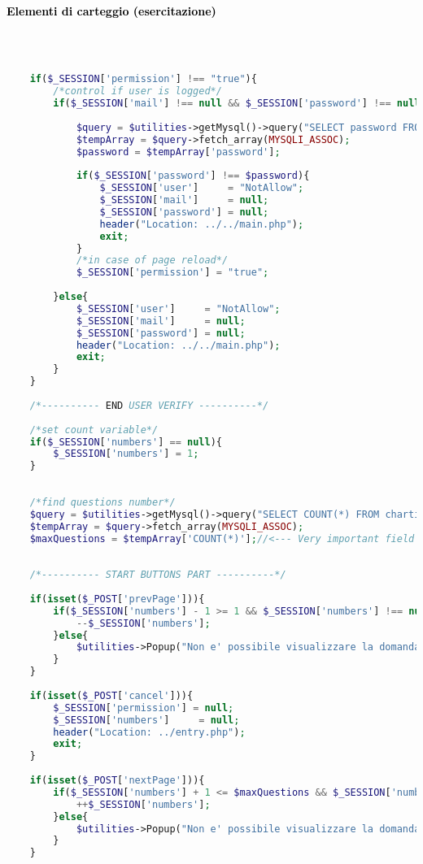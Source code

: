 \paragraph{\textcolor{black}{Elementi di carteggio (esercitazione)}}\leavevmode\\

\begin{lstlisting}[language=php]
	
	if($_SESSION['permission'] !== "true"){
		/*control if user is logged*/
		if($_SESSION['mail'] !== null && $_SESSION['password'] !== null){
			
			$query = $utilities->getMysql()->query("SELECT password FROM user_table1 WHERE (email = '{$_SESSION['mail']}')");
			$tempArray = $query->fetch_array(MYSQLI_ASSOC);
			$password = $tempArray['password'];
			
			if($_SESSION['password'] !== $password){
				$_SESSION['user']     = "NotAllow";
				$_SESSION['mail']     = null;
				$_SESSION['password'] = null;
				header("Location: ../../main.php");
				exit;
			}
			/*in case of page reload*/
			$_SESSION['permission'] = "true";
			
		}else{
			$_SESSION['user']     = "NotAllow";
			$_SESSION['mail']     = null;
			$_SESSION['password'] = null;
			header("Location: ../../main.php");
			exit;
		}
	}
	
	/*---------- END USER VERIFY ----------*/
	
	/*set count variable*/
	if($_SESSION['numbers'] == null){
		$_SESSION['numbers'] = 1;
	}
	
	
	/*find questions number*/
	$query = $utilities->getMysql()->query("SELECT COUNT(*) FROM charting_elements");
	$tempArray = $query->fetch_array(MYSQLI_ASSOC);
	$maxQuestions = $tempArray['COUNT(*)'];//<--- Very important field
	
	
	/*---------- START BUTTONS PART ----------*/
	
	if(isset($_POST['prevPage'])){
		if($_SESSION['numbers'] - 1 >= 1 && $_SESSION['numbers'] !== null){
			--$_SESSION['numbers'];
		}else{
			$utilities->Popup("Non e' possibile visualizzare la domanda precedente");
		}
	}
	
	if(isset($_POST['cancel'])){
		$_SESSION['permission'] = null;
		$_SESSION['numbers']     = null;
		header("Location: ../entry.php");
		exit;
	}
	
	if(isset($_POST['nextPage'])){
		if($_SESSION['numbers'] + 1 <= $maxQuestions && $_SESSION['numbers'] !== null){
			++$_SESSION['numbers'];
		}else{
			$utilities->Popup("Non e' possibile visualizzare la domanda successiva");
		}
	}
	

\end{lstlisting}
